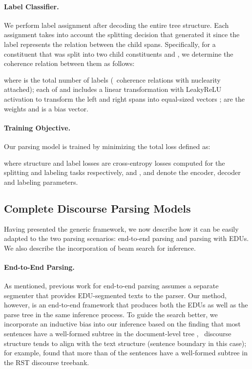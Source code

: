 \paragraph{Label Classifier.}

We perform label assignment after decoding the entire tree structure. Each assignment takes into account the splitting decision that generated it since the label represents the relation between the child spans.
Specifically, for a constituent  that was split into two child constituents  and , we determine the coherence relation between them as follows:


\small 

\normalsize

\noindent where  is the total number of labels (\ie\ coherence relations with nuclearity attached); each of  and  includes a linear transformation with LeakyReLU activation to transform the left and right spans into equal-sized vectors ;  are the weights and  is a bias vector. 





\paragraph{Training Objective.}
Our parsing model is trained by minimizing the total loss defined as:

where structure  and label  losses are cross-entropy losses computed for the splitting and labeling tasks respectively, and ,  and  denote the encoder, decoder and labeling parameters. 

\subsection{Complete Discourse Parsing Models}\label{sec:complete_models}
Having presented the generic framework, we now describe how it can be easily adapted to the two parsing scenarios: \Ni end-to-end parsing and \Nii parsing with EDUs. We also describe the incorporation of beam search for inference.


\paragraph{End-to-End Parsing.} As mentioned, previous work for end-to-end parsing assumes a separate segmenter that provides EDU-segmented texts to the parser. Our method, however, is an end-to-end framework that produces both the EDUs as well as the parse tree in the same inference process. To guide the search better, we incorporate an inductive bias into our inference based on the finding that most sentences have a well-formed subtree in the document-level tree \citep{soricut-marcu-2003-sentence}, \ie\ discourse structure tends to align with the text structure (sentence boundary in this case); for example,  \citet{fisher-roark-2007-utility,joty-carenini-ng-mehdad-acl-13} found that more than  of the sentences have a well-formed subtree in the RST discourse treebank. 


